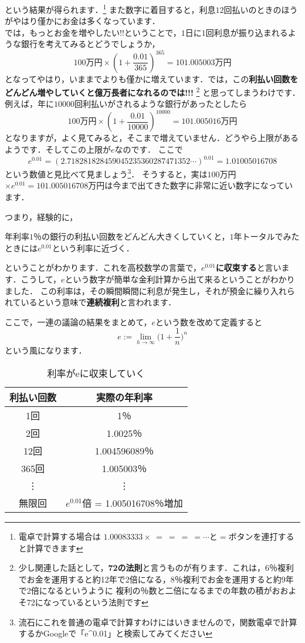 という結果が得られます．\footnote{電卓で計算する場合は $1.00083333 \times\  = \ = \ = \ = \dotsb $と$=$ボタンを連打すると計算できます}
また数字に着目すると，利息$12$回払いのときのほうがやはり僅かにお金は多くなっています．\\
では，もっとお金を増やしたい!!ということで，$1$日に$1$回利息が振り込まれるような銀行を考えてみるとどうでしょうか，
\[
100\mbox{万円}\times \left(1 + \frac{0.01}{365}\right)^{365} = 101.005003 \mbox{万円}
\]
となってやはり，いままでよりも僅かに増えています．では，この\textbf{利払い回数をどんどん増やしていくと億万長者になれるのでは!!!}
\footnote{少し関連した話として，\textbf{72の法則}と言うものが有ります．これは，6％複利でお金を運用すると約12年で2倍になる，8％複利でお金を運用すると約9年で2倍になるというように
複利の％数と二倍になるまでの年数の積がおおよそ72になっているという法則です}
と思ってしまうわけです．例えば，年に$10000$回利払いがされるような銀行があったとしたら
\[
100\mbox{万円}\times (1 + \frac{0.01}{10000})^{10000} = 101.005016 \mbox{万円}
\]
となりますが，よく見てみると，そこまで増えていません．どうやら上限があるようです．そしてこの上限が$e$なのです．
ここで
\[
e^{0.01} = (2.718281828459045235360287471352 \cdots )^{0.01} = 1.01005016708
\]
という数値と見比べて見ましょう\footnote{流石にこれを普通の電卓で計算すわけにはいきませんので，関数電卓で計算するかGoogleで「e\^{}0.01」と検索してみてください}．
そうすると，実は$100$万円$\times e^{0.01} =  101.005016708$万円は今まで出てきた数字に非常に近い数字になっています．

つまり，経験的に，
\begin{center}
年利率$1$％の銀行の利払い回数をどんどん大きくしていくと，$1$年トータルでみたときには$e^{0.01}$という利率に近づく．
\end{center}
ということがわかります．これを高校数学の言葉で，\textbf{$e^{0.01}$に収束する}と言います．こうして，$e$という数字が簡単な金利計算から出て来るということがわかりました．
この利率は，その瞬間瞬間に利息が発生し，それが預金に繰り入れられているという意味で\textbf{連続複利}と言われます．

ここで，一連の議論の結果をまとめて，$e$という数を改めて定義すると
\[
e := \lim_{h \to \infty} \biggl( 1 + \frac{1}{n}\biggl)^n
\]
という風になります．
\begin{table}[hbtp]
  \caption{利率がeに収束していく}
  \label{table:data_type}
  \centering
  \begin{tabular}{c|c}
    \hline
    利払い回数  & 実際の年利率  \\
    \hline \hline
    1回  & 1％ \\
    2回  & 1.0025％ \\
    12回  & 1.004596089％ \\
    365回  &  1.005003％\\
	\vdots & \vdots \\
	無限回 & $e^{0.01}$倍 = 1.005016708％増加\\
    \hline
  \end{tabular}
\end{table}

